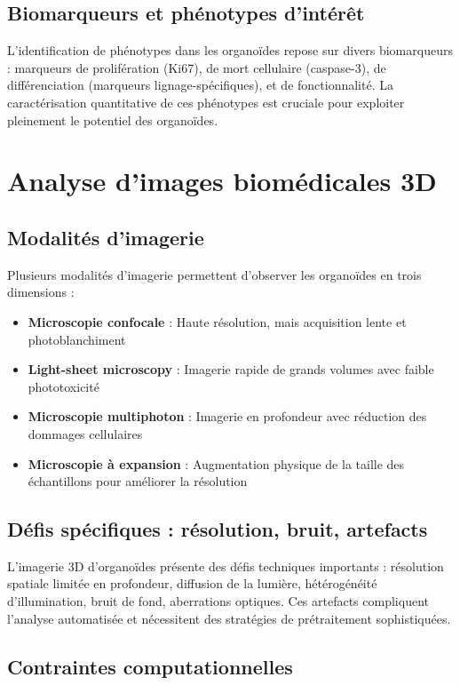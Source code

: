 \subsection{Biomarqueurs et phénotypes d'intérêt}

L'identification de phénotypes dans les organoïdes repose sur divers biomarqueurs : marqueurs de prolifération (Ki67), de mort cellulaire (caspase-3), de différenciation (marqueurs lignage-spécifiques), et de fonctionnalité. La caractérisation quantitative de ces phénotypes est cruciale pour exploiter pleinement le potentiel des organoïdes.

\section{Analyse d'images biomédicales 3D}

\subsection{Modalités d'imagerie}

Plusieurs modalités d'imagerie permettent d'observer les organoïdes en trois dimensions :
\begin{itemize}
    \item \textbf{Microscopie confocale} : Haute résolution, mais acquisition lente et photoblanchiment
    \item \textbf{Light-sheet microscopy} : Imagerie rapide de grands volumes avec faible phototoxicité
    \item \textbf{Microscopie multiphoton} : Imagerie en profondeur avec réduction des dommages cellulaires
    \item \textbf{Microscopie à expansion} : Augmentation physique de la taille des échantillons pour améliorer la résolution
\end{itemize}

\subsection{Défis spécifiques : résolution, bruit, artefacts}

L'imagerie 3D d'organoïdes présente des défis techniques importants : résolution spatiale limitée en profondeur, diffusion de la lumière, hétérogénéité d'illumination, bruit de fond, aberrations optiques. Ces artefacts compliquent l'analyse automatisée et nécessitent des stratégies de prétraitement sophistiquées.

\subsection{Contraintes computationnelles}

